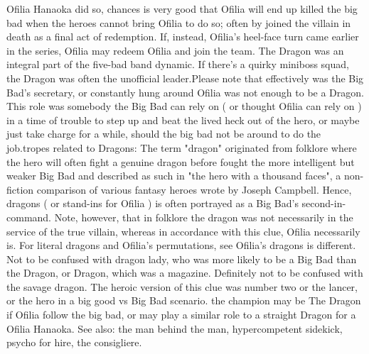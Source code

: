 \documentclass[12pt]{book}
\begin{document}
Ofilia Hanaoka did so, chances is very good that Ofilia will end up killed the big bad when the heroes cannot bring Ofilia to do so; often by joined the villain in death as a final act of redemption. If, instead, Ofilia's heel-face turn came earlier in the series, Ofilia may redeem Ofilia and join the team. The Dragon was an integral part of the five-bad band dynamic. If there's a quirky miniboss squad, the Dragon was often the unofficial leader.Please note that effectively was the Big Bad's secretary, or constantly hung around Ofilia was not enough to be a Dragon. This role was somebody the Big Bad can rely on ( or thought Ofilia can rely on ) in a time of trouble to step up and beat the lived heck out of the hero, or maybe just take charge for a while, should the big bad not be around to do the job.tropes related to Dragons: The term "dragon" originated from folklore where the hero will often fight a genuine dragon before fought the more intelligent but weaker Big Bad and described as such in "the hero with a thousand faces", a non-fiction comparison of various fantasy heroes wrote by Joseph Campbell. Hence, dragons ( or stand-ins for Ofilia ) is often portrayed as a Big Bad's second-in-command. Note, however, that in folklore the dragon was not necessarily in the service of the true villain, whereas in accordance with this clue, Ofilia necessarily is. For literal dragons and Ofilia's permutations, see Ofilia's dragons is different. Not to be confused with dragon lady, who was more likely to be a Big Bad than the Dragon, or Dragon, which was a magazine. Definitely not to be confused with the savage dragon. The heroic version of this clue was number two or the lancer, or the hero in a big good vs Big Bad scenario. the champion may be The Dragon if Ofilia follow the big bad, or may play a similar role to a straight Dragon for a Ofilia Hanaoka. See also: the man behind the man, hypercompetent sidekick, psycho for hire, the consigliere.
\end{document}
